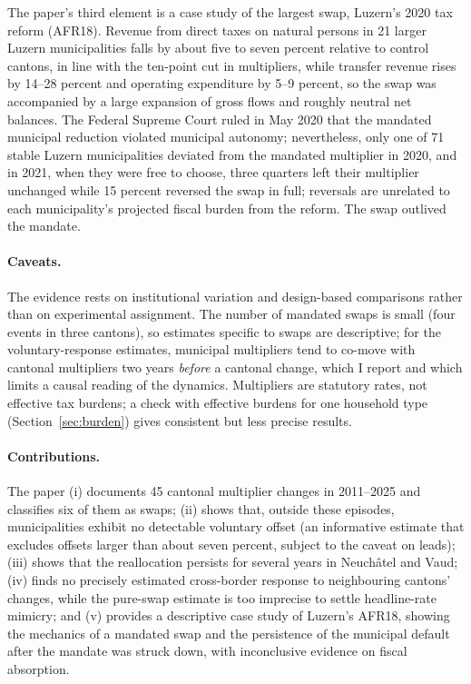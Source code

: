 \documentclass[11pt,a4paper]{article}
\begin{document}
The paper's third element is a case study of the largest swap, Luzern's 2020 tax reform (AFR18). Revenue from direct taxes on natural persons in 21 larger Luzern municipalities falls by about five to seven percent relative to control cantons, in line with the ten-point cut in multipliers, while transfer revenue rises by 14--28 percent and operating expenditure by 5--9 percent, so the swap was accompanied by a large expansion of gross flows and roughly neutral net balances. The Federal Supreme Court ruled in May 2020 that the mandated municipal reduction violated municipal autonomy; nevertheless, only one of 71 stable Luzern municipalities deviated from the mandated multiplier in 2020, and in 2021, when they were free to choose, three quarters left their multiplier unchanged while 15 percent reversed the swap in full; reversals are unrelated to each municipality's projected fiscal burden from the reform. The swap outlived the mandate.

\paragraph{Caveats.} The evidence rests on institutional variation and design-based comparisons rather than on experimental assignment. The number of mandated swaps is small (four events in three cantons), so estimates specific to swaps are descriptive; for the voluntary-response estimates, municipal multipliers tend to co-move with cantonal multipliers two years \emph{before} a cantonal change, which I report and which limits a causal reading of the dynamics. Multipliers are statutory rates, not effective tax burdens; a check with effective burdens for one household type (Section~\ref{sec:burden}) gives consistent but less precise results.

\paragraph{Contributions.} The paper (i) documents 45 cantonal multiplier changes in 2011--2025 and classifies six of them as swaps; (ii) shows that, outside these episodes, municipalities exhibit no detectable voluntary offset (an informative estimate that excludes offsets larger than about seven percent, subject to the caveat on leads); (iii) shows that the reallocation persists for several years in Neuch\^atel and Vaud; (iv) finds no precisely estimated cross-border response to neighbouring cantons' changes, while the pure-swap estimate is too imprecise to settle headline-rate mimicry; and (v) provides a descriptive case study of Luzern's AFR18, showing the mechanics of a mandated swap and the persistence of the municipal default after the mandate was struck down, with inconclusive evidence on fiscal absorption.
\end{document}
